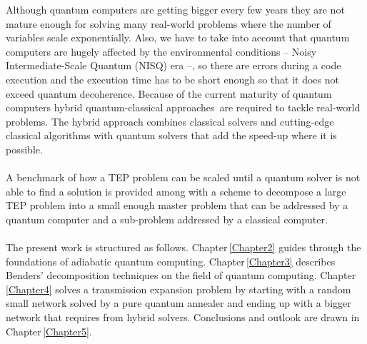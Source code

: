 %
%
Although quantum computers are getting bigger every few years they are not mature enough for solving many real-world problems where the number of variables scale exponentially. Also, we have to take into account that quantum computers are hugely affected by the environmental conditions -- Noisy Intermediate-Scale Quantum (NISQ) era --, so there are errors during a code execution and the execution time has to be short enough so that it does not exceed quantum decoherence. Because of the current maturity of quantum computers hybrid quantum-classical approaches\,\cite{Callison2022HybridBeyond} are required to tackle real-world problems. The hybrid approach combines classical solvers and cutting-edge classical algorithms with quantum solvers that add the speed-up where it is possible.\\\\
A benchmark of how a TEP problem can be scaled until a quantum solver is not able to find a solution is provided among with a scheme to decompose a large TEP problem into a small enough master problem that can be addressed by a quantum computer and a sub-problem addressed by a classical computer. \\\\
%
The present work is structured as follows. Chapter\,\ref{Chapter2} guides through the foundations of adiabatic quantum computing. Chapter\,\ref{Chapter3} describes Benders' decomposition techniques on the field of quantum computing. Chapter\,\ref{Chapter4} solves a transmission expansion problem by starting with a random small network solved by a pure quantum annealer and ending up with a bigger network that requires from hybrid solvers. Conclusions and outlook are drawn in Chapter\,\ref{Chapter5}.
